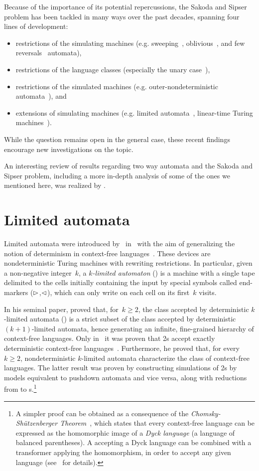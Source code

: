 Because of the importance of its potential repercussions, the Sakoda and Sipser problem has been tackled in many ways over the past decades, spanning four lines of development:
\begin{itemize}
	\item restrictions of the simulating machines (e.g. sweeping~\cite{Sip80}, oblivious~\cite{HroSch03}, and few reversals~\cite{Kap13} automata),
	\item restrictions of the language classes (especially the unary case~\cite{GefMer+07}),
	\item restrictions of the simulated machines (e.g. outer-nondeterministic automata~\cite{GefGui+14,KapPig15}), and
	\item extensions of simulating machines (e.g. limited automata~\cite{PigPis14,PigPri19,GuiPri19,PigPri+22}, linear-time Turing machines~\cite{Pru14,GuiPig+18,Hen65,GuiPig+23,Har68}).
\end{itemize}
While the question remains open in the general case, these recent findings encourage new investigations on the topic.

An interesting review of results regarding two way automata and the Sakoda and Sipser problem, including a more in-depth analysis of some of the ones we mentioned here, was realized by .


\section{Limited automata}
Limited automata were introduced by~ in~\citeyear{Hib67} with the aim of generalizing the notion of determinism in context-free languages~\cite{Hib67}.
These devices are nondeterministic Turing machines with rewriting restrictions.
In particular, given a non-negative integer~$k$, a \emph{$k$-limited automaton} (\kLA) is a machine with a single tape delimited to the cells initially containing the input by special symbols called end-markers ($\rhd$,$\lhd$), which can only write on each cell on its first~$k$ visits.

In his seminal paper, \citeauthor{Hib67} proved that, for~$k\ge2$, the class accepted by deterministic $k$-limited automata (\kDLAs) is a strict subset of the class accepted by deterministic~$(k+1)$-limited automata, hence generating an infinite, fine-grained hierarchy of context-free languages.
Only in~\citeyear{PigPis15} it was proven that \DLA2s accept exactly deterministic context-free languages~\cite{PigPis15}.
Furthermore, he proved that, for every~$k\ge2$, nondeterministic $k$-limited automata characterize the class of context-free languages.
The latter result was proven by constructing simulations of \LA2s by models equivalent to pushdown automata and vice versa, along with reductions from \kLAs to s.\footnote{%
	A simpler proof can be obtained as a consequence of the \emph{Chomsky-Shützenberger Theorem}~\cite{ChoSch63}, which states that every context-free language can be expressed as the homomorphic image of a \emph{Dyck language} (a language of balanced parentheses).
	A  accepting a Dyck language can be combined with a transformer applying the homomorphism, in order to accept any given language (see~\cite{Pig19} for details).}

